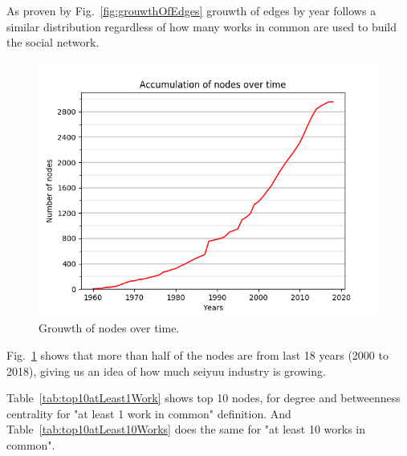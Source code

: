 As proven by Fig.~\ref{fig:grouwthOfEdges} grouwth of edges by year follows a similar distribution regardless of how many works in common are used to build the social network.

\begin{figure}[!hbt]
	\begin{center}
	\includegraphics[width=\columnwidth]{graphics/nodesAccumulation.png}
	\caption{Grouwth of nodes over time.}
	\label{fig:grouwthOfNodes}
	\end{center}
\end{figure}
 
Fig.~\ref{fig:grouwthOfNodes} shows that more than half of the nodes are from last 18 years (2000 to 2018), giving us an idea of how much seiyuu industry is growing.

\FloatBarrier
Table~\ref{tab:top10atLeast1Work} shows top 10 nodes, for degree and betweenness centrality for "at least 1 work in common" definition. And Table~\ref{tab:top10atLeast10Works} does the same for "at least 10 works in common".

